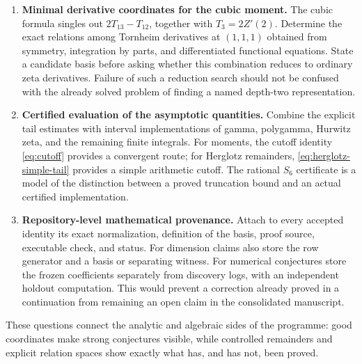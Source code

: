 \begin{enumerate}[leftmargin=*,label=\textbf{R\arabic*.},itemsep=0.65em]
\item \textbf{Minimal derivative coordinates for the cubic moment.}
The cubic formula singles out \(2T_{13}-T_{12}\), together with
\(T_3=2Z'(2)\). Determine the exact relations among Tornheim
derivatives at \((1,1,1)\) obtained from symmetry, integration by
parts, and differentiated functional equations. State a candidate
basis before asking whether this combination reduces to ordinary
zeta derivatives. Failure of such a reduction search should not be
confused with the already solved problem of finding a named
depth-two representation.

\item \textbf{Certified evaluation of the asymptotic quantities.}
Combine the explicit tail estimates with interval implementations
of gamma, polygamma, Hurwitz zeta, and the remaining finite
integrals. For moments, the cutoff identity
\eqref{eq:cutoff} provides a convergent route; for Herglotz remainders,
\eqref{eq:herglotz-simple-tail} provides a simple arithmetic cutoff.
The rational \(S_6\) certificate is a model of the distinction between
a proved truncation bound and an actual certified implementation.

\item \textbf{Repository-level mathematical provenance.}
Attach to every accepted identity its exact normalization,
definition of the basis, proof source, executable check, and status.
For dimension claims also store the row generator and a basis or
separating witness. For numerical conjectures store the frozen
coefficients separately from discovery logs, with an independent
holdout computation. This would prevent a correction already
proved in a continuation from remaining an open claim in the
consolidated manuscript.

\end{enumerate}

These questions connect the analytic and algebraic sides of the
programme: good coordinates make strong conjectures visible, while
controlled remainders and explicit relation spaces show exactly
what has, and has not, been proved.

